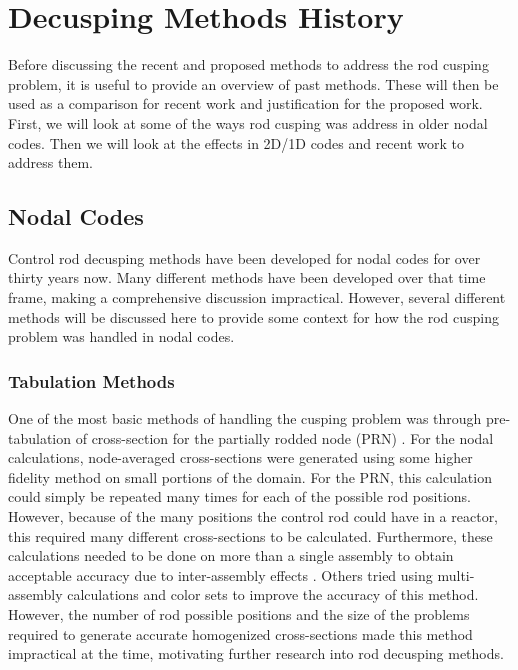 \section{Decusping Methods History}

Before discussing the recent and proposed methods to address the rod cusping problem, it is useful to provide an overview of past methods.  These will then be used as a comparison for recent work and justification for the proposed work.  First, we will look at some of the ways rod cusping was address in older nodal codes.  Then we will look at the effects in 2D/1D codes and recent work to address them.

\subsection{Nodal Codes}

Control rod decusping methods have been developed for nodal codes for over thirty years now.  Many different methods have been developed over that time frame, making a comprehensive discussion impractical.  However, several different methods will be discussed here to provide some context for how the rod cusping problem was handled in nodal codes.

\subsubsection{Tabulation Methods}

One of the most basic methods of handling the cusping problem was through pre-tabulation of cross-section for the partially rodded node (PRN) \cite{HanSemJooThesis1984}.  For the nodal calculations, node-averaged cross-sections were generated using some higher fidelity method on small portions of the domain.  For the PRN, this calculation could simply be repeated many times for each of the possible rod positions.  However, because of the many positions the control rod could have in a reactor, this required many different cross-sections to be calculated.  Furthermore, these calculations needed to be done on more than a single assembly to obtain acceptable accuracy due to inter-assembly effects \cite{KordSmithThesis1980spatial}.  Others tried using multi-assembly calculations \cite{hoxieThesis1982application} and color sets \cite{khalilThesis1983application} to improve the accuracy of this method.  However, the number of rod possible positions and the size of the problems required to generate accurate homogenized cross-sections made this method impractical at the time, motivating further research into rod decusping methods.

